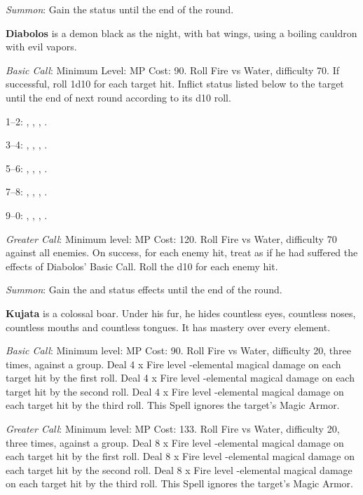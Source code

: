 \begin{multicols}{2}
    \textit{Summon}: Gain the  status until the end of the round.
    
    \textbf{Diabolos} is a demon black as the night, with bat wings, using a boiling cauldron with evil vapors.
    
    \textit{Basic Call}: Minimum Level:  MP Cost: 90. Roll Fire vs Water, difficulty 70. If successful, roll 1d10 for each target hit. Inflict status listed below to the target until the end of next round according to its d10 roll.

    1--2: , , , .

    3--4: , , , .
    
    5--6: , , , .
    
    7--8: , , , .
    
    9--0: , , , .
        
\textit{Greater Call}: Minimum level:  MP Cost: 120. Roll Fire vs Water, difficulty 70 against all enemies. On success, for each enemy hit, treat as if he had suffered the effects of Diabolos’ Basic Call. Roll the d10 for each enemy hit.

\textit{Summon}: Gain the   and   status effects until the end of the round.
    
\textbf{Kujata} is a colossal boar. Under his fur, he hides countless eyes, countless noses, countless mouths and countless tongues. It has mastery over every element.
    
    \textit{Basic Call}: Minimum level:  MP Cost: 90. Roll Fire vs Water, difficulty 20, three times, against a group. Deal 4 x Fire level -elemental magical damage on each target hit by the first roll. Deal 4 x Fire level -elemental magical damage on each target hit by the second roll. Deal 4 x Fire level -elemental magical damage on each target hit by the third roll. This Spell ignores the target’s Magic Armor.
    
    \textit{Greater Call}: Minimum level:  MP Cost: 133. Roll Fire vs Water, difficulty 20, three times, against a group. Deal 8 x Fire level -elemental magical damage on each target hit by the first roll. Deal 8 x Fire level -elemental magical damage on each target hit by the second roll. Deal 8 x Fire level -elemental magical damage on each target hit by the third roll. This Spell ignores the target’s Magic Armor.
    

\end{multicols}
